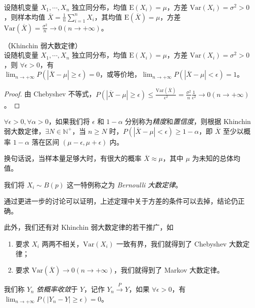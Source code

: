 \documentclass[../main.tex]{subfiles}
\begin{document}
设随机变量 $X_1,\cdots,X_n$ 独立同分布，均值 $\mathrm E(X_i)=\mu$，方差 $\mathrm{Var}(X_i)=\sigma^2>0$，则样本均值 $\overline X=\frac1n\sum_{i=1}^nX_i$，其均值 $\mathrm E(\overline X)=\mu$，方差 $\mathrm{Var}(\overline X)=\frac{\sigma^2}n\rightarrow0(n\rightarrow+\infty)$。


\begin{theorem}\label{thm:5.2.1}
    （Khinchin 弱大数定律）\\
    设随机变量 $X_1,\cdots,X_n$ 独立同分布，均值 $\mathrm E(X_i)=\mu$，方差 $\mathrm{Var}(X_i)=\sigma^2>0$，则 $\forall\epsilon>0$，有\\
    $\lim_{n\rightarrow+\infty}P(|\overline X-\mu|\geq\epsilon)=0$，或等价地，$\lim_{n\rightarrow+\infty}P(|\overline X-\mu|<\epsilon)=1$。
\end{theorem}

\begin{proof}
    由 Chebyshev 不等式，$P(|\overline X-\mu|\geq\epsilon)\leq\frac{\mathrm{Var}(\overline X)}{\epsilon^2}=\frac{\sigma^2}n\frac1{\epsilon^2}\rightarrow0(n\rightarrow+\infty)$。
\end{proof}

$\forall\epsilon>0,\forall\alpha>0$，如果我们将 $\epsilon$ 和 $1-\alpha$ 分别称为\emph{精度}和\emph{置信度}，则根据 Khinchin 弱大数定律，$\exists N\in\mathbb N^+$，当 $n\geq N$ 时，$P(|\overline X-\mu|<\epsilon)\geq1-\alpha$，即 $\overline X$ 至少以概率 $1-\alpha$ 落在区间 $(\mu-\epsilon,\mu+\epsilon)$ 内。

换句话说，当样本量足够大时，有很大的概率 $\overline X\approx\mu$，其中 $\mu$ 为未知的总体均值。

我们将 $X_i\sim B(p)$ 这一特例称之为 \emph{Bernoulli 大数定律}。

通过更进一步的讨论可以证明，上述定理中关于方差的条件可以去掉，结论仍正确。

此外，我们还有对 Khinchin 弱大数定律的若干推广，如
\begin{enumerate}
    \item 要求 $X_i$ 两两不相关，$\mathrm{Var}(X_i)$ 一致有界，我们就得到了 Chebyshev 大数定律；
    \item 要求 $\mathrm{Var}(\overline X)\rightarrow0(n\rightarrow+\infty)$，我们就得到了 Markov 大数定律。
\end{enumerate}

\begin{definition}\label{def:5.2.1}
    我们称 $Y_n$ \emph{依概率收敛}于 $Y$，记作 $Y_n\overset{P}{\rightarrow}Y$，如果 $\forall\epsilon>0$，有 $\lim_{n\rightarrow+\infty}P(|Y_n-Y|\geq\epsilon)=0$。
\end{definition}
\end{document}
